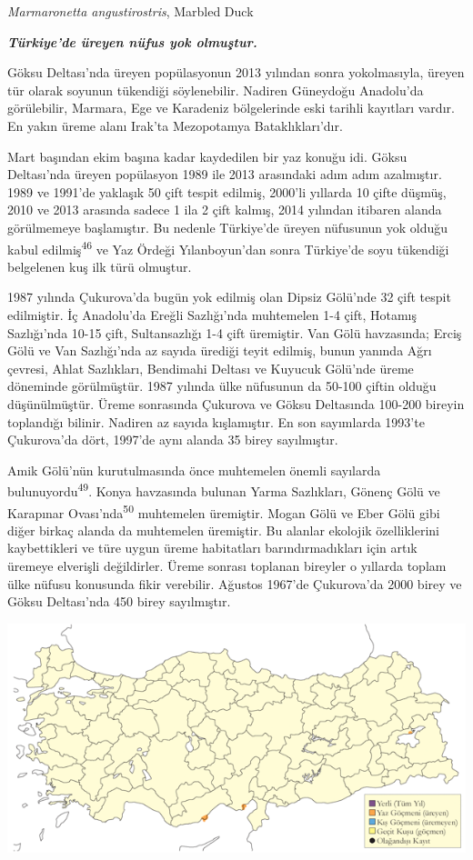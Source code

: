 \documentclass[
  letterpaper,
  DIV=11,
  numbers=noendperiod]{scrreprt}
\begin{document}
\emph{Marmaronetta angustirostris}, Marbled Duck

\textbf{\emph{Türkiye'de üreyen nüfus yok olmuştur.}}

Göksu Deltası'nda üreyen popülasyonun 2013 yılından sonra yokolmasıyla,
üreyen tür olarak soyunun tükendiği söylenebilir. Nadiren Güneydoğu
Anadolu'da görülebilir, Marmara, Ege ve Karadeniz bölgelerinde eski
tarihli kayıtları vardır. En yakın üreme alanı Irak'ta Mezopotamya
Bataklıkları'dır.

Mart başından ekim başına kadar kaydedilen bir yaz konuğu idi. Göksu
Deltası'nda üreyen popülasyon 1989 ile 2013 arasındaki adım adım
azalmıştır. 1989 ve 1991'de yaklaşık 50 çift tespit edilmiş, 2000'li
yıllarda 10 çifte düşmüş, 2010 ve 2013 arasında sadece 1 ila 2 çift
kalmış, 2014 yılından itibaren alanda görülmemeye başlamıştır. Bu
nedenle Türkiye'de üreyen nüfusunun yok olduğu kabul
edilmiş\textsuperscript{46} ve Yaz Ördeği Yılanboyun'dan sonra
Türkiye'de soyu tükendiği belgelenen kuş ilk türü olmuştur.

1987 yılında Çukurova'da bugün yok edilmiş olan Dipsiz Gölü'nde 32 çift
tespit edilmiştir. İç Anadolu'da Ereğli Sazlığı'nda muhtemelen 1-4 çift,
Hotamış Sazlığı'nda 10-15 çift, Sultansazlığı 1-4 çift üremiştir. Van
Gölü havzasında; Erciş Gölü ve Van Sazlığı'nda az sayıda ürediği teyit
edilmiş, bunun yanında Ağrı çevresi, Ahlat Sazlıkları, Bendimahi Deltası
ve Kuyucuk Gölü'nde üreme döneminde görülmüştür. 1987 yılında ülke
nüfusunun da 50-100 çiftin olduğu düşünülmüştür. Üreme sonrasında
Çukurova ve Göksu Deltasında 100-200 bireyin toplandığı bilinir. Nadiren
az sayıda kışlamıştır. En son sayımlarda 1993'te Çukurova'da dört,
1997'de aynı alanda 35 birey sayılmıştır.

Amik Gölü'nün kurutulmasında önce muhtemelen önemli sayılarda
bulunuyordu\textsuperscript{49}. Konya havzasında bulunan Yarma
Sazlıkları, Gönenç Gölü ve Karapınar Ovası'nda\textsuperscript{50}
muhtemelen üremiştir. Mogan Gölü ve Eber Gölü gibi diğer birkaç alanda
da muhtemelen üremiştir. Bu alanlar ekolojik özelliklerini kaybettikleri
ve türe uygun üreme habitatları barındırmadıkları için artık üremeye
elverişli değildirler. Üreme sonrası toplanan bireyler o yıllarda toplam
ülke nüfusu konusunda fikir verebilir. Ağustos 1967'de Çukurova'da 2000
birey ve Göksu Deltası'nda 450 birey sayılmıştır.

\includegraphics{images/harita_Page_021.png}
\end{document}
